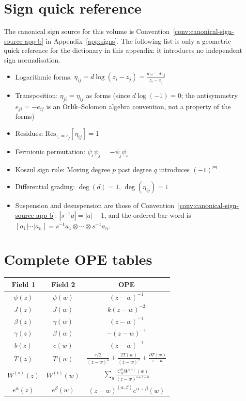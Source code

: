 \chapter{Sign quick reference}
\label{app:sign-conventions-general}

The canonical sign source for this volume is
Convention~\ref{conv:canonical-sign-source-app-b} in
Appendix~\ref{app:signs}. The following list is only a geometric
quick reference for the dictionary in this appendix; it introduces no
independent sign normalisation.
\begin{itemize}
\item Logarithmic forms: $\eta_{ij} = d\log(z_i - z_j) = \frac{dz_i - dz_j}{z_i - z_j}$
\item Transposition: $\eta_{ji} = \eta_{ij}$ as forms (since $d\log(-1) = 0$; the antisymmetry $e_{ji} = -e_{ij}$ is an Orlik--Solomon algebra convention, not a property of the forms)
\item Residues: $\text{Res}_{z_i=z_j}[\eta_{ij}] = 1$
\item Fermionic permutation: $\psi_i\psi_j = -\psi_j\psi_i$
\item Koszul sign rule: Moving degree $p$ past degree $q$ introduces $(-1)^{pq}$
\item Differential grading: $\deg(d) = 1$, $\deg(\eta_{ij}) = 1$
\item Suspension and desuspension are those of
Convention~\ref{conv:canonical-sign-source-app-b}:
\(|s^{-1}a|=|a|-1\), and the ordered bar word is
\([a_1|\cdots|a_n]=s^{-1}a_1\otimes\cdots\otimes s^{-1}a_n\).
\end{itemize}

\chapter{Complete OPE tables}
\label{app:ope-tables}

\begin{center}
\begin{tabular}{|c|c|c|}
\hline
Field 1 & Field 2 & OPE \\
\hline
$\psi(z)$ & $\psi(w)$ & $(z-w)^{-1}$ \\
$J(z)$ & $J(w)$ & $k(z-w)^{-2}$ \\
$\beta(z)$ & $\gamma(w)$ & $(z-w)^{-1}$ \\
$\gamma(z)$ & $\beta(w)$ & $-(z-w)^{-1}$ \\
$b(z)$ & $c(w)$ & $(z-w)^{-1}$ \\
$T(z)$ & $T(w)$ & $\frac{c/2}{(z-w)^4} + \frac{2T(w)}{(z-w)^2} + \frac{\partial T(w)}{z-w}$ \\
$W^{(s)}(z)$ & $W^{(t)}(w)$ & $\sum_u \frac{C^u_{st} W^{(u)}(w)}{(z-w)^{s+t-u}}$ \\
$e^\alpha(z)$ & $e^\beta(w)$ & $(z-w)^{(\alpha,\beta)} e^{\alpha+\beta}(w)$ \\
\hline
\end{tabular}
\end{center}

